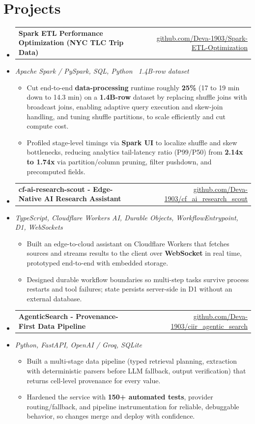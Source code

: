 \documentclass[letterpaper,10pt]{article}
\makeatletter
\newcommand{\resumeItem}[1]{
  \item\small{#1\vspace{-1pt}}
}
\newcommand{\resumeProjectHeading}[2]{
    \item
    \begin{tabular*}{0.985\textwidth}[t]{l@{\extracolsep{\fill}}r}
      \small\textbf{#1} & \small #2 \\
    \end{tabular*}\vspace{-5pt}
}
\newcommand{\resumeProjectSubheading}[1]{
  \vspace{-2pt}\item[] {\small\textcolor{ResumeSlate}{\emph{#1}}}\vspace{-3pt}
}
\newcommand{\resumeSubHeadingListStart}{\begin{itemize}[leftmargin=0.0in, label={}, itemsep=2pt, topsep=2pt]}
\newcommand{\resumeSubHeadingListEnd}{\end{itemize}}
\newcommand{\resumeItemListStart}{\begin{itemize}[leftmargin=0.18in, itemsep=2pt, topsep=1pt]}
\newcommand{\resumeItemListEnd}{\end{itemize}\vspace{-4pt}}
\makeatother
\begin{document}
\section{Projects}
\resumeSubHeadingListStart
  \resumeProjectHeading
    {Spark ETL Performance Optimization (NYC TLC Trip Data)}
    {\href{https://github.com/Deva-1903/Spark-ETL-Optimization}{github.com/Deva-1903/Spark-ETL-Optimization}}
  \resumeProjectSubheading{Apache Spark / PySpark, SQL, Python \enspace\textbar\enspace ~1.4B-row dataset}
    \resumeItemListStart
      \resumeItem{Cut end-to-end \textbf{data-processing} runtime roughly \textbf{25\%} (17 to 19 min down to 14.3 min) on a \textbf{1.4B-row} dataset by replacing shuffle joins with broadcast joins, enabling adaptive query execution and skew-join handling, and tuning shuffle partitions, to scale efficiently and cut compute cost.}
      \resumeItem{Profiled stage-level timings via \textbf{Spark UI} to localize shuffle and skew bottlenecks, reducing analytics tail-latency ratio (P99/P50) from \textbf{2.14x to 1.74x} via partition/column pruning, filter pushdown, and precomputed fields.}
    \resumeItemListEnd
  \resumeProjectHeading
    {cf-ai-research-scout - Edge-Native AI Research Assistant}
    {\href{https://github.com/Deva-1903/cf_ai_research_scout}{github.com/Deva-1903/cf\_ai\_research\_scout}}
  \resumeProjectSubheading{TypeScript, Cloudflare Workers AI, Durable Objects, WorkflowEntrypoint, D1, WebSockets}
    \resumeItemListStart
      \resumeItem{Built an edge-to-cloud assistant on Cloudflare Workers that fetches sources and streams results to the client over \textbf{WebSocket} in real time, prototyped end-to-end with embedded storage.}
      \resumeItem{Designed durable workflow boundaries so multi-step tasks survive process restarts and tool failures; state persists server-side in D1 without an external database.}
    \resumeItemListEnd
  \resumeProjectHeading
    {AgenticSearch - Provenance-First Data Pipeline}
    {\href{https://github.com/Deva-1903/ciir_agentic_search}{github.com/Deva-1903/ciir\_agentic\_search}}
  \resumeProjectSubheading{Python, FastAPI, OpenAI / Groq, SQLite}
    \resumeItemListStart
      \resumeItem{Built a multi-stage data pipeline (typed retrieval planning, extraction with deterministic parsers before LLM fallback, output verification) that returns cell-level provenance for every value.}
      \resumeItem{Hardened the service with \textbf{150+ automated tests}, provider routing/fallback, and pipeline instrumentation for reliable, debuggable behavior, so changes merge and deploy with confidence.}
    \resumeItemListEnd
\resumeSubHeadingListEnd
\vspace{-4pt}
\end{document}
